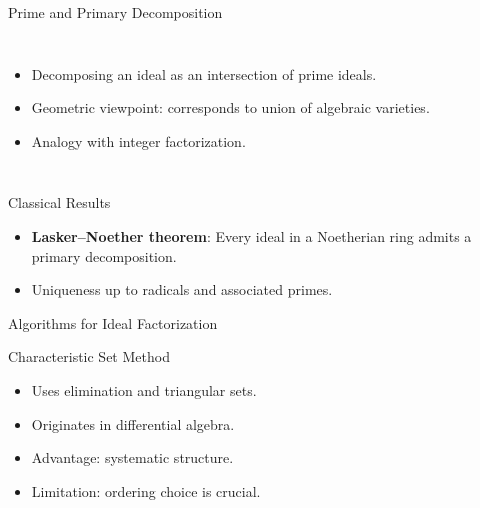 \documentclass[11pt]{beamer}
\begin{document}
\begin{frame}{Prime and Primary Decomposition}
\begin{columns}
\begin{itemize}
  \item Decomposing an ideal as an intersection of prime ideals.
  \item Geometric viewpoint: corresponds to union of algebraic varieties.
  \item Analogy with integer factorization.
\end{itemize}
\centering
{}
\end{columns}
\end{frame}

\begin{frame}{Classical Results}
\begin{itemize}
  \item \textbf{Lasker–Noether theorem}: Every ideal in a Noetherian ring admits a primary decomposition.
  \item Uniqueness up to radicals and associated primes.
\end{itemize}
\end{frame}

\begin{frame}{Algorithms for Ideal Factorization}
\centering
{}
\end{frame}

\begin{frame}{Characteristic Set Method}
\begin{itemize}
  \item Uses elimination and triangular sets.
  \item Originates in differential algebra.
  \item Advantage: systematic structure.
  \item Limitation: ordering choice is crucial.
\end{itemize}
\end{frame}
\end{document}
